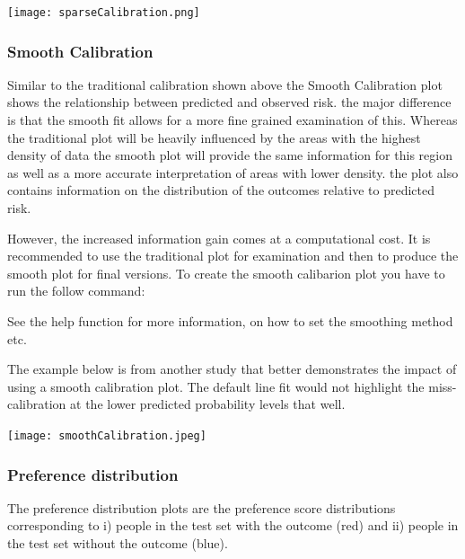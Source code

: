 \documentclass[]{article}
\newenvironment{Shaded}{\begin{snugshade}}{\end{snugshade}}
\newcommand{\KeywordTok}[1]{\textcolor[rgb]{0.13,0.29,0.53}{\textbf{#1}}}
\newcommand{\OperatorTok}[1]{\textcolor[rgb]{0.81,0.36,0.00}{\textbf{#1}}}
\newcommand{\NormalTok}[1]{#1}
\begin{document}
\texttt{[image: sparseCalibration.png]}

\newpage

\subsubsection{Smooth Calibration}\label{smooth-calibration}

Similar to the traditional calibration shown above the Smooth
Calibration plot shows the relationship between predicted and observed
risk. the major difference is that the smooth fit allows for a more fine
grained examination of this. Whereas the traditional plot will be
heavily influenced by the areas with the highest density of data the
smooth plot will provide the same information for this region as well as
a more accurate interpretation of areas with lower density. the plot
also contains information on the distribution of the outcomes relative
to predicted risk.

However, the increased information gain comes at a computational cost.
It is recommended to use the traditional plot for examination and then
to produce the smooth plot for final versions. To create the smooth
calibarion plot you have to run the follow command:

\begin{Shaded}
\end{Shaded}

See the help function for more information, on how to set the smoothing
method etc.

The example below is from another study that better demonstrates the
impact of using a smooth calibration plot. The default line fit would
not highlight the miss-calibration at the lower predicted probability
levels that well.

\texttt{[image: smoothCalibration.jpeg]}

\newpage

\subsubsection{Preference distribution}\label{preference-distribution}

The preference distribution plots are the preference score distributions
corresponding to i) people in the test set with the outcome (red) and
ii) people in the test set without the outcome (blue).
\end{document}
